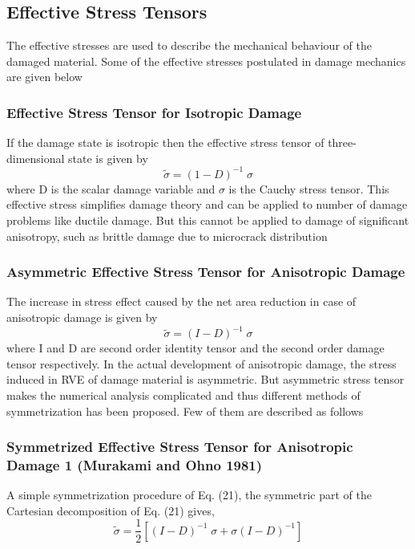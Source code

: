 \documentclass[a4paper,12pt]{article}
\begin{document}
\subsection{Effective Stress Tensors}
\indent\indent\indent The effective stresses are  used to describe the mechanical behaviour of the damaged material. Some of the effective stresses postulated in damage mechanics are given below
\subsubsection{Effective Stress Tensor for Isotropic Damage}
\indent\indent\indent If the damage state is isotropic then the effective stress tensor of three-dimensional state is given by
\begin{equation}
\tilde{\sigma} = (1 - D)^{-1} \; \sigma
\end{equation}
where D is the scalar damage variable and $\sigma$ is the Cauchy stress tensor. This effective stress simplifies damage theory and can be applied to number of damage problems like ductile damage. But this cannot be applied to damage of significant anisotropy, such as brittle damage due to microcrack distribution\\
\subsubsection{Asymmetric Effective Stress Tensor for Anisotropic Damage}
\indent\indent\indent The increase in stress effect caused by the net area reduction in case of anisotropic damage is given by
\begin{equation}
\tilde{\sigma} = (I - D)^{-1} \; \sigma
\end{equation}
where I and D are second order identity tensor and the second order damage tensor respectively. In the actual development of anisotropic damage, the stress induced in RVE of damage material is asymmetric. But asymmetric stress tensor makes the numerical analysis complicated and thus different methods of symmetrization has been proposed. Few of them are described as follows
\newpage
\subsubsection{Symmetrized Effective Stress Tensor for Anisotropic Damage 1 (Murakami and Ohno 1981)} 
\indent\indent\indent A simple symmetrization procedure of Eq. (21), the symmetric part of the Cartesian decomposition of Eq. (21) gives,
\begin{equation}
\tilde{\sigma} = \frac{1}{2} [(I - D)^{-1}\;\sigma + \sigma(I - D)^{-1}]
\end{equation}\\
\end{document}
